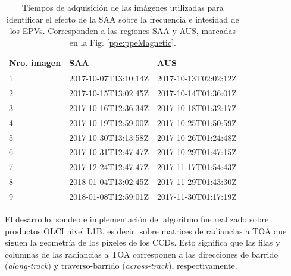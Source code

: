     \begin{table}
    \caption[Tiempos de adquisición de las imágenes utilizadas para identificar el efecto de la SAA sobre la frecuencia e intesidad de los EPVs.]{Tiempos de adquisición de las imágenes utilizadas para identificar el efecto de la SAA sobre la frecuencia e intesidad de los EPVs. Corresponden a las regiones SAA y AUS, marcadas en la Fig. \ref{ppe:ppeMagnetic}.}
    \centering
    \begin{tabular}{|l|l|l|}
    \hline
    \textbf{Nro. imagen} & \textbf{SAA} & \textbf{AUS}\\
    \hline
    1 & 2017-10-07T13:10:14Z & 2017-10-13T02:02:12Z \\
    \hline
    2 & 2017-10-15T13:02:45Z & 2017-10-14T01:36:01Z \\
    \hline
    3 & 2017-10-16T12:36:34Z & 2017-10-18T01:32:17Z \\
    \hline
    4 & 2017-10-19T12:59:00Z & 2017-10-25T01:50:59Z \\
    \hline
    5 & 2017-10-30T13:13:58Z & 2017-10-26T01:24:48Z \\
    \hline
    6 & 2017-10-31T12:47:47Z & 2017-10-29T01:47:15Z \\
    \hline
    7 & 2017-12-24T12:47:47Z & 2017-11-17T01:54:43Z \\
    \hline
    8 & 2018-01-04T13:02:45Z & 2017-11-29T01:43:30Z \\
    \hline
    9 & 2018-01-08T12:59:01Z & 2017-11-30T01:17:19Z \\
    \hline
    \end{tabular}
    \label{tab:img}
    \end{table}
    
    El desarrollo, sondeo e implementación del algoritmo fue realizado sobre productos OLCI nivel L1B, es decir, sobre matrices de radiancias a TOA que siguen la geometría de los píxeles de los CCDs. Esto significa que las filas y columnas de las radiancias a TOA corresponen a las direcciones de barrido (\textit{along-track}) y traverso-barrido (\textit{across-track}), respectivamente.
    
